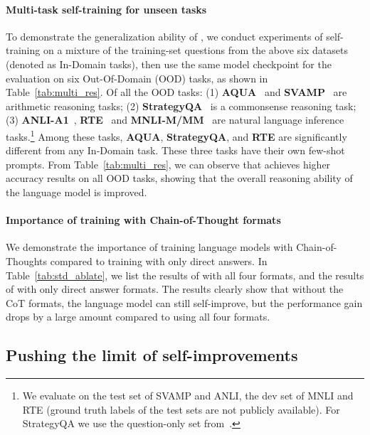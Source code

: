 
\paragraph{Multi-task self-training for unseen tasks}
To demonstrate the generalization ability of \method, we conduct experiments of self-training on a mixture of the training-set questions from the above six datasets (denoted as In-Domain tasks), then use the same model checkpoint for the evaluation on six Out-Of-Domain (OOD) tasks, as shown in Table~\ref{tab:multi_res}. Of all the OOD tasks: (1) \textbf{AQUA}~\citep{Ling2017ProgramIB} and \textbf{SVAMP}~\citep{Patel2021AreNM} are arithmetic reasoning tasks; (2) \textbf{StrategyQA}~\citep{Geva2021DidAU} is a commonsense reasoning task; (3) \textbf{ANLI-A1}~\citep{Mihaylov2018CanAS}, \textbf{RTE}~\citep{Dagan2005ThePR} and \textbf{MNLI-M/MM}~\citep{Williams2018ABC} are natural language inference tasks.\footnote{We evaluate on the test set of SVAMP and ANLI, the dev set of MNLI and RTE (ground truth labels of the test sets are not publicly available). For StrategyQA we use the question-only set from~\cite{Srivastava2022BeyondTI}.} Among these tasks, \textbf{AQUA}, \textbf{StrategyQA}, and \textbf{RTE} are significantly different from any In-Domain task. These three tasks have their own few-shot prompts. From Table~\ref{tab:multi_res}, we can observe that \method achieves higher accuracy results on all OOD tasks, showing that the overall reasoning ability of the language model is improved.


\paragraph{Importance of training with Chain-of-Thought formats}
We demonstrate the importance of training language models with Chain-of-Thoughts compared to training with only direct answers. In Table~\ref{tab:std_ablate}, we list the results of \method with all four formats, and the results of \method with only direct answer formats.
The results clearly show that without the CoT formats, the language model can still self-improve, but the performance gain drops by a large amount compared to using all four formats.

\subsection{Pushing the limit of self-improvements}
\label{sec:exp_limits}

